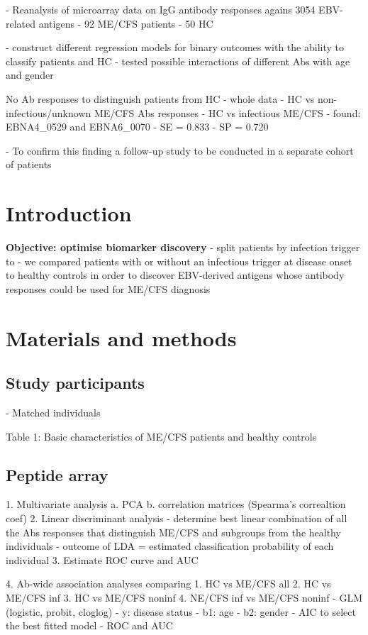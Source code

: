 - Reanalysis of microarray data on IgG antibody responses agains 3054 EBV-related antigens
- 92 ME/CFS patients
- 50 HC

- construct different regression models for binary outcomes with the ability to classify patients and HC
    - tested possible interactions of different Abs with age and gender

No Ab responses to distinguish patients from HC
    - whole data
    - HC vs non-infectious/unknown ME/CFS
Abs responses
    - HC vs infectious ME/CFS
    - found: EBNA4\_0529 and EBNA6\_0070
    - SE = 0.833
    - SP = 0.720

- To confirm this finding a follow-up study to be conducted in a separate cohort of patients

\section{Introduction}

\textbf{Objective: optimise biomarker discovery}
    - split patients by infection trigger to 
    - we compared patients with or without an infectious trigger at disease onset to healthy controls in order to discover EBV-derived antigens whose antibody responses could be used for ME/CFS diagnosis

\section{Materials and methods}
\subsection{Study participants}

- Matched individuals

Table 1: Basic characteristics of ME/CFS patients and healthy controls


\subsection{Peptide array}

1. Multivariate analysis
    a. PCA
    b. correlation matrices (Spearma's correaltion coef)
2. Linear discriminant analysis
    - determine best  linear combination of all the Abs responses that distinguish ME/CFS and subgroups from the healthy individuals
- outcome of LDA = estimated classification probability of each individual
3. Estimate ROC curve and AUC

4. Ab-wide association analyses comparing
    1. HC vs ME/CFS all
    2. HC vs ME/CFS inf
    3. HC vs ME/CFS noninf
    4. NE/CFS inf vs ME/CFS noninf
- GLM (logistic, probit, cloglog)
    - y: disease status
    - b1: age
    - b2: gender
- AIC to select the best fitted model
- ROC and AUC


